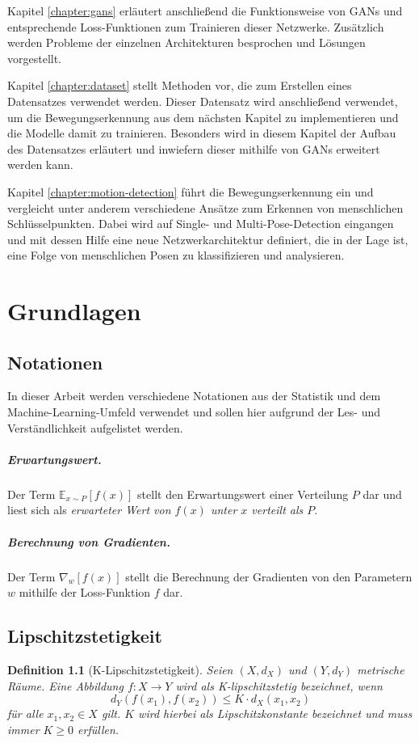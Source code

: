 \documentclass{hsflensburg}
\newtheorem{definition}{Definition}
\begin{document}
  Kapitel \ref{chapter:gans} erläutert anschließend die Funktionsweise von GANs
  und entsprechende Loss-Funktionen zum Trainieren dieser Netzwerke. Zusätzlich
  werden Probleme der einzelnen Architekturen besprochen und Lösungen
  vorgestellt.

  Kapitel \ref{chapter:dataset} stellt Methoden vor, die zum Erstellen eines
  Datensatzes verwendet werden. Dieser Datensatz wird anschließend verwendet, um
  die Bewegungserkennung aus dem nächsten Kapitel zu implementieren und die
  Modelle damit zu trainieren. Besonders wird in diesem Kapitel der Aufbau des
  Datensatzes erläutert und inwiefern dieser mithilfe von GANs erweitert werden
  kann.

  Kapitel \ref{chapter:motion-detection} führt die Bewegungserkennung ein und
  vergleicht unter anderem verschiedene Ansätze zum Erkennen von menschlichen
  Schlüsselpunkten. Dabei wird auf Single- und Multi-Pose-Detection eingangen
  und mit dessen Hilfe eine neue Netzwerkarchitektur definiert, die in der Lage
  ist, eine Folge von menschlichen Posen zu klassifizieren und analysieren.

  \chapter{Grundlagen}\label{chapter:basics}
  \section{Notationen}
  In dieser Arbeit werden verschiedene Notationen aus der Statistik und dem
  Machine-Learning-Umfeld verwendet und sollen hier aufgrund der Les- und
  Verständlichkeit aufgelistet werden.

  \paragraph{Erwartungswert.}
  Der Term $\mathbb{E}_{x \sim P}\left[f(x)\right]$ stellt den Erwartungswert
  einer Verteilung $P$ dar und liest sich als \textit{erwarteter Wert von
  $f(x)$ unter $x$ verteilt als $P$}.

  \paragraph{Berechnung von Gradienten.}
  Der Term $\nabla_w\left[f(x)\right]$ stellt die Berechnung der Gradienten von
  den Parametern $w$ mithilfe der Loss-Funktion $f$ dar.

  \section{Lipschitzstetigkeit}
  \begin{definition}[K-Lipschitzstetigkeit]
    Seien $(X, d_X)$ und $(Y, d_Y)$ metrische Räume. Eine Abbildung $f: X \to Y$
    wird als K-lipschitzstetig bezeichnet, wenn
    \[
      d_Y(f(x_1), f(x_2)) \leq K \cdot d_X(x_1, x_2)
    \]
    für alle $x_1, x_2 \in X$ gilt. $K$ wird hierbei als Lipschitzkonstante
    bezeichnet und muss immer $K \geq 0$ erfüllen.
  \end{definition}
\end{document}
